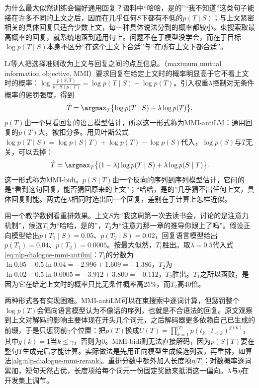 为什么最大似然训练会偏好通用回复？语料中“哈哈，是的”“我不知道”这类句子能接在许多不同的上文之后，因而在几乎任何$S$下都有不低的$p(T\mid S)$；与上文紧密相关的具体回复只适合少数上文，每一种具体说法分到的概率都较小。束搜索取最高概率的回复，就系统地落到通用句上。问题不在于模型没学会，而在于目标$\log p(T\mid S)$本身不区分“在这个上文下合适”与“在所有上文下都合适”。

Li等人把选择准则改为上文与回复之间的点互信息。（maximum mutual information objective, MMI）要求回复在给定上文时的概率明显高于它不看上文时的概率：$\log\frac{p(S,T)}{p(S)p(T)}=\log p(T\mid S)-\log p(T)$。引入权重$\lambda$控制对无条件概率的惩罚强度，得到
\begin{equation}
 \hat T=\argmax_{T}\bigl\{\log p(T\mid S)-\lambda\log p(T)\bigr\}.
 \label{eq:nlp-dialogue-mmi-antilm}
\end{equation}
$p(T)$由一个只看回复的语言模型估计，所以这一形式称为MMI-antiLM：通用回复的$p(T)$大，被扣分多。用贝叶斯公式$\log p(T\mid S)=\log p(S\mid T)+\log p(T)-\log p(S)$代入，$\log p(S)$与$T$无关，可以去掉：
\begin{equation}
 \hat T=\argmax_{T}\bigl\{(1-\lambda)\log p(T\mid S)+\lambda\log p(S\mid T)\bigr\}.
 \label{eq:nlp-dialogue-mmi-bidi}
\end{equation}
这一形式称为MMI-bidi。$p(S\mid T)$由一个反向的序列到序列模型估计，它问的是“看到这句回复，能否猜回原来的上文”；“哈哈，是的”几乎猜不出任何上文，具体回复则能。两式在$\lambda$相同时选出同一个回复，差别在于计算上怎样近似。

用一个教学数例看重排效果。上文$S$为“我这周第一次去读书会，讨论的是注意力机制”，候选$T_1$为“哈哈，是的”，$T_2$为“注意力那一章的推导你跟上了吗”。假设正向模型给出$p(T_1\mid S)=0.05$、$p(T_2\mid S)=0.02$，回复语言模型给出$p(T_1)=0.04$、$p(T_2)=0.0005$。按最大似然，$T_1$胜出。取$\lambda=0.5$代入式\eqref{eq:nlp-dialogue-mmi-antilm}：$T_1$的分数为$\ln0.05-0.5\ln0.04=-2.996+1.609=-1.386$，$T_2$为$\ln0.02-0.5\ln0.0005=-3.912+3.800=-0.112$，$T_2$胜出。$T_1$之所以落败，是因为它在给定上文时的概率只比无条件概率高25\%，而$T_2$高40倍。

两种形式各有实现困难。MMI-antiLM可以在束搜索中逐词计算，但惩罚整个$\log p(T)$会偏向语言模型认为不像话的序列，也就是不合语法的回复。原文观察到上文对解码的影响主要体现在开头几个词元，之后解码器更多依赖自己已生成的前缀，于是只惩罚前$\gamma$个位置：把$p(T)$换成$U(T)=\prod_{k=1}^{|T|}p(t_k\mid t_{<k})^{g(k)}$，其中$g(k)=1$当$k\le\gamma$，否则为0。MMI-bidi则无法直接解码，因为$p(S\mid T)$要在整句$T$生成完后才能计算。实际做法是先用正向模型生成候选列表，再重排，如算法\ref{alg:nlp-dialogue-mmi-rerank}。重排分数中额外加入长度项$\eta|T|$：对数概率逐词累加，短句天然占优，长度项给每个词元一份固定奖励来抵消这一偏向。$\lambda$与$\eta$在开发集上调节。

